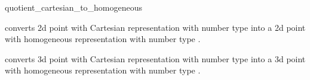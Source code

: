 \begin{ccRefFunction}{quotient_cartesian_to_homogeneous}

        {converts 2d point  with Cartesian representation  
         with number type  into a 2d point 
         with homogeneous representation with number type .}

        {converts 3d point  with Cartesian representation  
         with number type  into a 3d point 
         with homogeneous representation with number type .}
\end{ccRefFunction}

